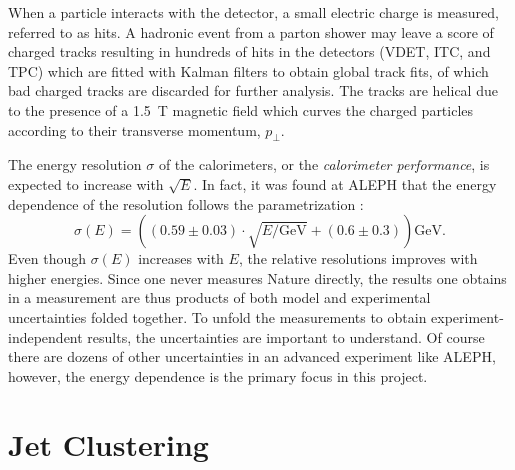 When a particle interacts with the detector, a small electric charge is measured, referred to as hits. A hadronic event from a parton shower may leave a score of charged tracks resulting in hundreds of hits in the detectors (VDET, ITC, and TPC) which are fitted with Kalman filters \autocite{kalmanNewApproachLinear1960} to obtain global track fits, of which bad charged tracks are discarded for further analysis. The tracks are helical due to the presence of a \SI{1.5}{T} magnetic field which curves the charged particles according to their transverse momentum, $p_\perp$.

The energy resolution $\sigma$ of the calorimeters, or the \emph{calorimeter performance}, is expected to increase with $\sqrt{E}$. In fact, it was found at ALEPH that the energy dependence of the resolution follows the parametrization \autocite{buskulicInvestigationBd0Bs01994}:
\begin{equation}
  \sigma(E) = \left( \left( 0.59 \pm 0.03 \right) \cdot \sqrt{E / \mathrm{GeV}} +  \left(0.6 \pm 0.3 \right) \right) \mathrm{GeV}.
\end{equation}
Even though $\sigma(E)$ increases with $E$, the relative resolutions improves with higher energies. Since one never measures Nature directly, the results one obtains in a measurement are thus products of both model and experimental uncertainties folded together. To unfold the measurements to obtain experiment-independent results, the uncertainties are important to understand. Of course there are dozens of other uncertainties in an advanced experiment like ALEPH, however, the energy dependence is the primary focus in this project. 

\section{Jet Clustering}
\label{sec:hep:jet_clustering}

